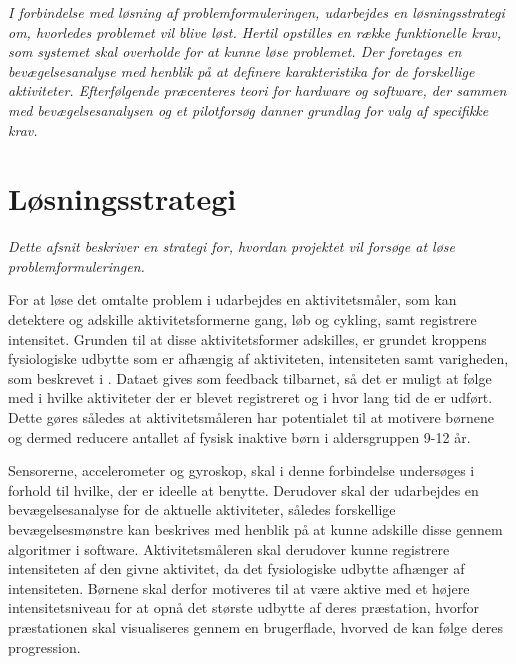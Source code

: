 \textit{I forbindelse med løsning af problemformuleringen, udarbejdes en løsningsstrategi om, hvorledes problemet vil blive løst. Hertil opstilles en række funktionelle krav, som systemet skal overholde for at kunne løse problemet. Der foretages en bevægelsesanalyse med henblik på at definere karakteristika for de forskellige aktiviteter. Efterfølgende præcenteres teori for hardware og software, der sammen med bevægelsesanalysen og et pilotforsøg danner grundlag for valg af specifikke krav.}

\section{Løsningsstrategi}
\textit{Dette afsnit beskriver en strategi for, hvordan projektet vil forsøge at løse problemformuleringen.}

For at løse det omtalte problem i  udarbejdes en aktivitetsmåler, som kan detektere og adskille aktivitetsformerne gang, løb og cykling, samt registrere intensitet. Grunden til at disse aktivitetsformer adskilles, er grundet kroppens fysiologiske udbytte som er afhængig af aktiviteten, intensiteten samt varigheden, som beskrevet i . Dataet gives som feedback tilbarnet, så det er muligt at følge med i hvilke aktiviteter der er blevet registreret og i hvor lang tid de er udført. Dette gøres således at aktivitetsmåleren har potentialet til at motivere børnene og dermed reducere antallet af fysisk inaktive børn i aldersgruppen 9-12 år.

Sensorerne, accelerometer og gyroskop, skal i denne forbindelse undersøges i forhold til hvilke, der er ideelle at benytte. Derudover skal der udarbejdes en bevægelsesanalyse for de aktuelle aktiviteter, således forskellige bevægelsesmønstre kan beskrives med henblik på at kunne adskille disse gennem algoritmer i software. Aktivitetsmåleren skal derudover kunne registrere intensiteten af den givne aktivitet, da det fysiologiske udbytte afhænger af intensiteten. Børnene skal derfor motiveres til at være aktive med et højere intensitetsniveau for at opnå det største udbytte af deres præstation, hvorfor præstationen skal visualiseres gennem en brugerflade, hvorved de kan følge deres progression.





